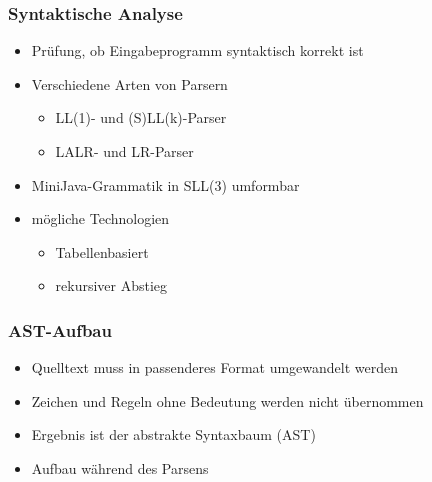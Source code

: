 \begin{frame}
    \frametitle{Syntaktische Analyse}
    \begin{itemize}
    \item Prüfung, ob Eingabeprogramm syntaktisch korrekt ist
    \item Verschiedene Arten von Parsern
    	\begin{itemize}
    	\item LL(1)- und (S)LL(k)-Parser
    	\item LALR- und LR-Parser
    	\end{itemize}
    \item MiniJava-Grammatik in SLL(3) umformbar \pause
    \item mögliche Technologien
	    \begin{itemize}
		\item Tabellenbasiert
		\item rekursiver Abstieg
    	\end{itemize}
    \end{itemize}
\end{frame}

\begin{frame}
	\frametitle{AST-Aufbau}
	\begin{itemize}
	\item Quelltext muss in passenderes Format umgewandelt werden
	\item Zeichen und Regeln ohne Bedeutung werden nicht übernommen
	\item Ergebnis ist der abstrakte Syntaxbaum (AST)
	\item Aufbau während des Parsens
	\end{itemize}
\end{frame}

